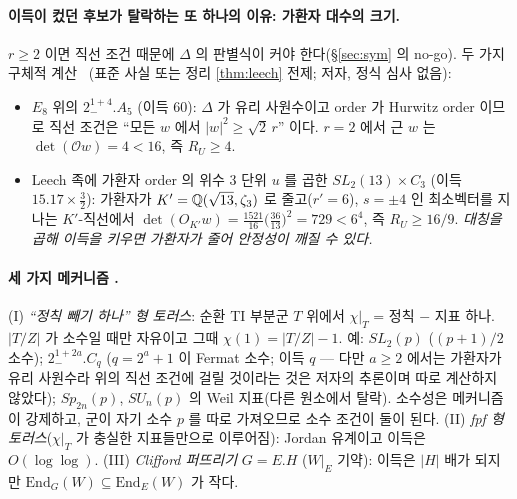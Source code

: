 \paragraph{이득이 컸던 후보가 탈락하는 또 하나의 이유: 가환자 대수의 크기.} $r\ge2$ 이면 직선 조건 때문에 $\Delta$ 의 판별식이 커야 한다(\S\ref{sec:sym} 의 no-go). 두 가지 구체적 계산 \tagP\ (표준 사실 또는 정리 \ref{thm:leech} 전제; 저자, 정식 심사 없음):
\begin{itemize}
\item $E_8$ 위의 $2^{1+4}_-.A_5$ (이득 60): $\Delta$ 가 유리 사원수이고 order 가 Hurwitz order 이므로 직선 조건은 ``모든 $w$ 에서 $|w|^2\ge\sqrt2\,r$'' 이다. $r=2$ 에서 근 $w$ 는 $\det(\mathcal Ow)=4<16$, 즉 $R_U\ge4$.
\item Leech 족에 가환자 order 의 위수 3 단위 $u$ 를 곱한 $SL_2(13)\times C_3$ (이득 $15.17\times\tfrac32$): 가환자가 $K'=\mathbb{Q}(\sqrt{13},\zeta_3)$ 로 줄고($r'=6$), $s=\pm4$ 인 최소벡터를 지나는 $K'$-직선에서 $\det(O_{K'}w)=\tfrac{1521}{16}\big(\tfrac{36}{13}\big)^2=729<6^4$, 즉 $R_U\ge16/9$. \emph{대칭을 곱해 이득을 키우면 가환자가 줄어 안정성이 깨질 수 있다.}
\end{itemize}

\paragraph{세 가지 메커니즘 \tagH.} (I) \emph{``정칙 빼기 하나'' 형 토러스}: 순환 TI 부분군 $T$ 위에서 $\chi|_T$ = 정칙 $-$ 지표 하나. $|T/Z|$ 가 소수일 때만 자유이고 그때 $\chi(1)=|T/Z|-1$. 예: $SL_2(p)$ ($(p+1)/2$ 소수); $2^{1+2a}_-.C_q$ ($q=2^a+1$ 이 Fermat 소수; 이득 $q$ --- 다만 $a\ge2$ 에서는 가환자가 유리 사원수라 위의 직선 조건에 걸릴 것이라는 것은 저자의 추론이며 따로 계산하지 않았다); $Sp_{2n}(p)$, $SU_n(p)$ 의 Weil 지표(다른 원소에서 탈락). 소수성은 메커니즘이 강제하고, 군이 자기 소수 $p$ 를 따로 가져오므로 소수 조건이 둘이 된다. (II) \emph{fpf 형 토러스}($\chi|_T$ 가 충실한 지표들만으로 이루어짐): Jordan 유계이고 이득은 $O(\log\log)$. (III) \emph{Clifford 퍼뜨리기} $G=E.H$ ($W|_E$ 기약): 이득은 $|H|$ 배가 되지만 $\mathrm{End}_G(W)\subseteq\mathrm{End}_E(W)$ 가 작다.

